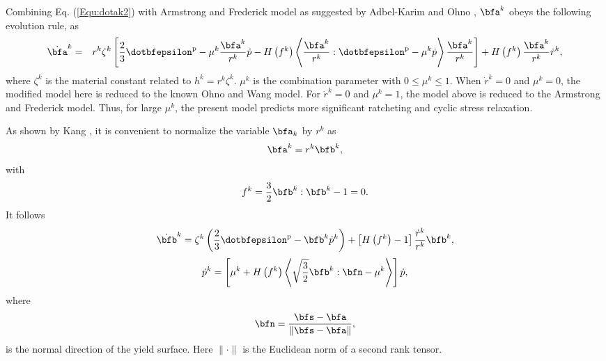 Combining Eq. (\ref{Equ:dotak2}) with Armstrong and Frederick model as suggested by Adbel-Karim and Ohno  \cite{AbdelKarim20051303},  ${\bfa^k}$ obeys the following evolution rule, as
\begin{eqnarray}
\label{Equ:dotak3}
{\dot\bfa^k} &=& {r^k}{\zeta ^k}\left[ \frac{2}{3}{{\dotbfepsilon}^{\rm{p}}} - {\mu ^k}\frac{\bfa^k}{r^k}\dot p - H\left( {f^k} \right) \left\langle {\frac{\bfa^k}{r^k}:{\dotbfepsilon}^{\rm{p}}} - {\mu ^k}\dot p \right\rangle \frac{\bfa^k}{r^k} \right]
+ H\left( {f^k} \right)\frac{\bfa^k}{r^k}{\dot r^k},
\end{eqnarray}
where ${\zeta ^k}$ is the material constant related to ${h^k} = {r^k}{\zeta ^k}$. ${\mu ^k}$ is the combination parameter with $0 \leqslant {\mu ^k} \leqslant 1$. When ${\dot r^k} = 0$ and ${\mu ^k} = 0$, the modified model here is reduced to the known Ohno and Wang model. For ${\dot r^k} = 0$ and ${\mu ^k} = 1$, the  model above is reduced to the Armstrong and Frederick model. Thus, for large ${\mu ^k}$, the present model predicts more significant ratcheting and cyclic stress relaxation.

As shown by Kang \cite{Kang2004299}, it is convenient to normalize the variable $\bfa_k$ by $r^k$ as
\begin{equation}
\label{Equ:ak1}
{\bfa^k} = {r^k}{\bfb^k},
\end{equation}
with
\begin{equation}
{f^k} = \frac{3}{2}{\bfb^k}:{\bfb^k} - 1 = 0.
\end{equation}
It follows
\begin{equation}
{\dot\bfb^k} = {\zeta ^k}\left( {\frac{2}{3}{\dotbfepsilon^{\rm{p}}} - {\bfb^k}{{\dot p}^k}} \right) + \left[ {H\left( {{f^k}} \right) - 1} \right]\frac{{{{\dot r}^k}}}{{{r^k}}}{\bfb^k},
\end{equation}
\begin{equation}
{\dot p^k} = \left[ {{\mu ^k} + H\left( {{f^k}} \right)\left\langle {\sqrt {\frac{3}{2}} {\bfb^k}:\bfn - {\mu ^k}} \right\rangle } \right]\dot p,
\end{equation}
where
\begin{equation}
\bfn = \frac{{\bfs - \bfa}}{{\left\| {\bfs - \bfa} \right\|}},
\end{equation}
is the normal direction of the yield surface. Here $\parallel\cdot\parallel$ is the Euclidean norm of a second rank tensor.


